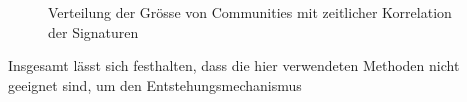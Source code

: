\begin{figure}[t]
  \caption{Verteilung der Gr\"osse von Communities mit zeitlicher
    Korrelation der Signaturen}
  \label{fig:time-corrdist}
\end{figure}


Insgesamt l\"asst sich festhalten, dass die hier verwendeten Methoden
nicht geeignet sind, um den Entstehungsmechanismus 



